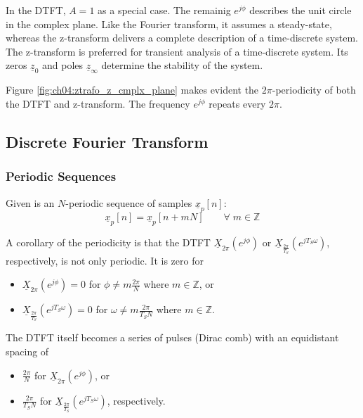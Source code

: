 \begin{refsection}
In the \acf{DTFT}, $A = 1$ as a special case. The remainig $e^{j \phi}$ describes the unit circle in the complex plane. Like the Fourier transform, it assumes a steady-state, whereas the z-transform delivers a complete description of a time-discrete system. The z-transform is preferred for transient analysis of a time-discrete system. Its zeros $\underline{z}_0$ and poles $\underline{z}_\infty$ determine the stability of the system.

Figure \ref{fig:ch04:ztrafo_z_cmplx_plane} makes evident the $2 \pi$-periodicity of both the \ac{DTFT} and z-transform. The frequency $e^{j \phi}$ repeats every $2 \pi$.

\subsection{Discrete Fourier Transform}

\subsubsection{Periodic Sequences}

Given is an $N$-periodic sequence of samples $\underline{x}_p[n]$:
\begin{equation}
	\underline{x}_p[n] = \underline{x}_p[n + mN] \qquad \forall \; m \in \mathbb{Z}
\end{equation}

A corollary of the periodicity is that the \ac{DTFT} $\underline{X}_{2 \pi} \left(e^{j \phi}\right)$ or $\underline{X}_{\frac{2\pi}{T_S}} \left(e^{j T_S \omega}\right)$, respectively, is not only periodic. It is zero for
\begin{itemize}
	\item $\underline{X}_{2 \pi} \left(e^{j \phi}\right) = 0$ for $\phi \neq m \frac{2\pi}{N}$ where $m \in \mathbb{Z}$, or
	\item $\underline{X}_{\frac{2\pi}{T_S}} \left(e^{j T_S \omega}\right) = 0$ for $\omega \neq m \frac{2\pi}{T_S N}$ where $m \in \mathbb{Z}$.
\end{itemize}
The \ac{DTFT} itself becomes a series of pulses (Dirac comb) with an equidistant spacing of
\begin{itemize}
	\item $\frac{2\pi}{N}$ for $\underline{X}_{2 \pi} \left(e^{j \phi}\right)$, or
	\item $\frac{2\pi}{T_S N}$ for $\underline{X}_{\frac{2\pi}{T_S}} \left(e^{j T_S \omega}\right)$, respectively.
\end{itemize}


\end{refsection}
